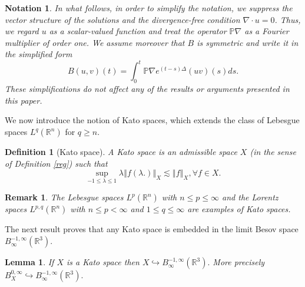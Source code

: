 \documentclass[11pt]{amsart}%
\theoremstyle{plain}
\numberwithin{equation}{section}
\newtheorem{lemma}{Lemma}[section]
\newtheorem{definition}{Definition}[section]
\newtheorem{remark}{Remark}[section]
\newtheorem{notation}{Notation}
\begin{document}
\begin{notation}
In what follows, in order to simplify the notation, we suppress the vector structure of the solutions and the divergence-free condition $\nabla\cdot u=0$. Thus, we regard $u$ as a scalar-valued function and treat the operator $\mathbb{P}\nabla$ as a Fourier multiplier of order one.  We assume moreover  that $B$ is symmetric  and write it in the simplified form
$$
B(u,v)(t)=\int_0^t \mathbb{P}\nabla e^{(t-s)\Delta}(uv)(s) ds.
$$
These simplifications do not affect any of the results or arguments presented in this paper.
\end{notation}
We now introduce the notion of Kato spaces, which extends the class of Lebesgue spaces $L^q(\mathbb{R}^n)$ for $q\geq n$.
\begin{definition}[Kato space]
A Kato  space is an admissible space $X$ (in the sense of Definition \ref{reg}) such
that
\[
\sup_{-1\leq\lambda \leq 1}\lambda \left\Vert f(\lambda .)\right\Vert
_{X}\lesssim \left\Vert f\right\Vert _{X},\forall f\in X.
\]

\end{definition}
\begin{remark}
The Lebesgue spaces $L^p(\mathbb{R}^n)$ with $n\leq p\leq\infty$ and the Lorentz spaces $L^{p,q}(\mathbb{R}^n)$ with $n\leq p<\infty$ and $1\leq q\leq\infty$ are examples of Kato spaces.
\end{remark}
The next result proves that any Kato space is embedded in the limit Besov space $B_{\infty }^{-1,\infty }(\mathbb{R}^{3}).$
\begin{lemma}\label{Linj}
If $X$ is a Kato space then $X\hookrightarrow B_{\infty }^{-1,\infty }(%
\mathbb{R}^{3}).$ More precisely $B^{0,\infty}_X\hookrightarrow B_{\infty }^{-1,\infty }(%
\mathbb{R}^{3}).$
\end{lemma}
\end{document}
